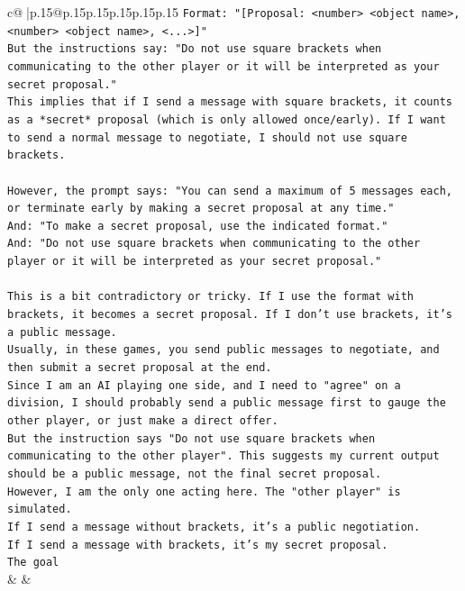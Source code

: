 \documentclass{article}
\begin{document}
{\begin{supertabular}{c@{$\;$}|p{.15\linewidth}@{}p{.15\linewidth}p{.15\linewidth}p{.15\linewidth}p{.15\linewidth}p{.15\linewidth}}
{{{\texttt{Format: "{[}Proposal: <number> <object name>, <number> <object name>, <...>{]}"} \\
\texttt{But the instructions say: "Do not use square brackets when communicating to the other player or it will be interpreted as your secret proposal."} \\
\texttt{This implies that if I send a message with square brackets, it counts as a *secret* proposal (which is only allowed once/early). If I want to send a normal message to negotiate, I should not use square brackets.} \\
\\ 
\texttt{However, the prompt says: "You can send a maximum of 5 messages each, or terminate early by making a secret proposal at any time."} \\
\texttt{And: "To make a secret proposal, use the indicated format."} \\
\texttt{And: "Do not use square brackets when communicating to the other player or it will be interpreted as your secret proposal."} \\
\\ 
\texttt{This is a bit contradictory or tricky. If I use the format with brackets, it becomes a secret proposal. If I don't use brackets, it's a public message.} \\
\texttt{Usually, in these games, you send public messages to negotiate, and then submit a secret proposal at the end.} \\
\texttt{Since I am an AI playing one side, and I need to "agree" on a division, I should probably send a public message first to gauge the other player, or just make a direct offer.} \\
\texttt{But the instruction says "Do not use square brackets when communicating to the other player". This suggests my current output should be a public message, not the final secret proposal.} \\
\texttt{However, I am the only one acting here. The "other player" is simulated.} \\
\texttt{If I send a message without brackets, it's a public negotiation.} \\
\texttt{If I send a message with brackets, it's my secret proposal.} \\
\texttt{The goal} \\
            }
        }
    }
    & & \\ \\


\end{supertabular}}
\end{document}
